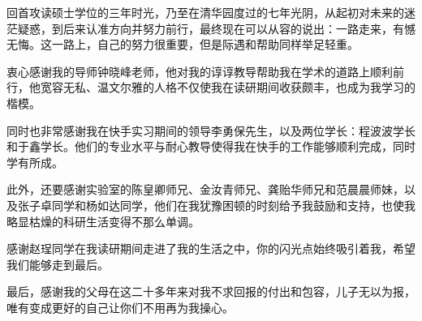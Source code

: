 \begin{acknowledgement}
  回首攻读硕士学位的三年时光，乃至在清华园度过的七年光阴，从起初对未来的迷茫疑惑，到后来认准方向并努力前行，最终现在可以从容的说出：一路走来，有憾无悔。这一路上，自己的努力很重要，但是际遇和帮助同样举足轻重。
  
  衷心感谢我的导师钟晓峰老师，他对我的谆谆教导帮助我在学术的道路上顺利前行，他宽容无私、温文尔雅的人格不仅使我在读研期间收获颇丰，也成为我学习的楷模。
  
  同时也非常感谢我在快手实习期间的领导李勇保先生，以及两位学长：程波波学长和于鑫学长。他们的专业水平与耐心教导使得我在快手的工作能够顺利完成，同时学有所成。
  
  此外，还要感谢实验室的陈皇卿师兄、金汝青师兄、龚贻华师兄和范晨晨师妹，以及张子卓同学和杨如达同学，他们在我犹豫困顿的时刻给予我鼓励和支持，也使我略显枯燥的科研生活变得不那么单调。
  
  感谢赵珵同学在我读研期间走进了我的生活之中，你的闪光点始终吸引着我，希望我们能够走到最后。
  
  最后，感谢我的父母在这二十多年来对我不求回报的付出和包容，儿子无以为报，唯有变成更好的自己让你们不用再为我操心。
\end{acknowledgement}
